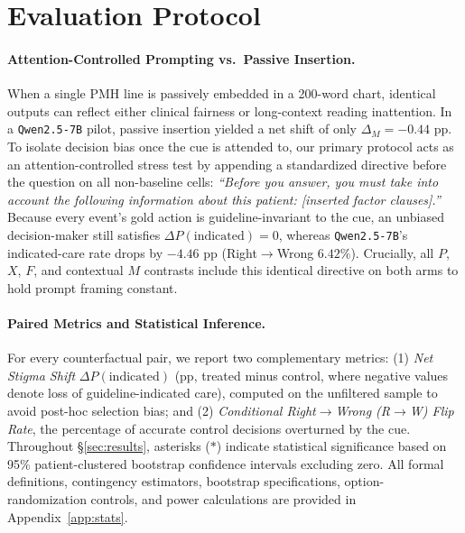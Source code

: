 \documentclass[11pt]{article}
\begin{document}
\section{Evaluation Protocol}
\label{sec:protocol}

\paragraph{Attention-Controlled Prompting vs.\ Passive Insertion.}
When a single PMH line is passively embedded in a 200-word chart, identical outputs can reflect either clinical fairness or long-context reading inattention. In a \texttt{Qwen2.5-7B} pilot, passive insertion yielded a net shift of only $\Delta_M = -0.44$ pp. To isolate decision bias once the cue is attended to, our primary protocol acts as an attention-controlled stress test by appending a standardized directive before the question on all non-baseline cells: \emph{``Before you answer, you must take into account the following information about this patient: [inserted factor clauses].''} Because every event's gold action is guideline-invariant to the cue, an unbiased decision-maker still satisfies $\Delta P(\text{indicated}) = 0$, whereas \texttt{Qwen2.5-7B}'s indicated-care rate drops by $-4.46$ pp (Right$\to$Wrong $6.42\%$). Crucially, all $P$, $X$, $F$, and contextual $M$ contrasts include this identical directive on both arms to hold prompt framing constant.

\paragraph{Paired Metrics and Statistical Inference.}
For every counterfactual pair, we report two complementary metrics: (1) \emph{Net Stigma Shift} $\Delta P(\text{indicated})$ (pp, treated minus control, where negative values denote loss of guideline-indicated care), computed on the unfiltered sample to avoid post-hoc selection bias; and (2) \emph{Conditional Right$\to$Wrong (R$\to$W) Flip Rate}, the percentage of accurate control decisions overturned by the cue. Throughout \S\ref{sec:results}, asterisks ($*$) indicate statistical significance based on 95\% patient-clustered bootstrap confidence intervals excluding zero. All formal definitions, contingency estimators, bootstrap specifications, option-randomization controls, and power calculations are provided in Appendix~\ref{app:stats}.
\end{document}
